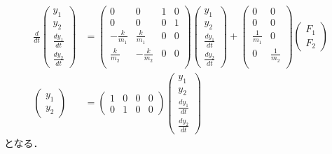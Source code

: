 \begin{align}
 \frac{d}{dt} \left(\begin{array}{c}
	             y_1 \\
		     y_2 \\
		     \frac{dy_1}{dt} \\
		     \frac{dy_2}{dt}
		    \end{array}\right)
 &=
 \left(\begin{array}{cccc}
        0 & 0 & 1 & 0     \\
        0 & 0 & 0 & 1     \\
	-\frac{k}{m_1} & \frac{k}{m_1} & 0 & 0 \\
	\frac{k}{m_2} & -\frac{k}{m_2} & 0 & 0 \\
       \end{array}\right)
 \left(\begin{array}{c}
        y_1 \\
	y_2 \\
	\frac{dy_1}{dt} \\
	\frac{dy_2}{dt}
       \end{array}\right)
 +
 \left(\begin{array}{cc}
        0 & 0 \\
        0 & 0 \\
	\frac{1}{m_1} & 0 \\
	0 & \frac{1}{m_2} \\
       \end{array}\right)
 \left(\begin{array}{c}
        F_1 \\
	F_2
       \end{array}\right) \\
 \left(\begin{array}{c}
        y_1 \\
	y_2
       \end{array}\right)
 &=
 \left(\begin{array}{cccc}
         1 & 0 & 0 & 0 \\
         0 & 1 & 0 & 0
       \end{array}\right)
 \left(\begin{array}{c}
        y_1 \\
	y_2 \\
	\frac{dy_1}{dt} \\
	\frac{dy_2}{dt}
       \end{array}\right)
\end{align}
となる．\\

